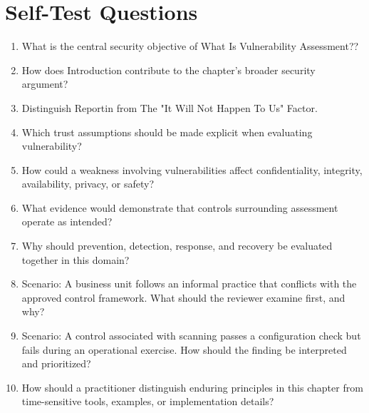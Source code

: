 \documentclass[11pt,letterpaper]{article}
\begin{document}
\section*{Self-Test Questions}
\begin{enumerate}
\item What is the central security objective of What Is Vulnerability Assessment??
\item How does Introduction contribute to the chapter's broader security argument?
\item Distinguish Reportin from The "It Will Not Happen To Us" Factor.
\item Which trust assumptions should be made explicit when evaluating vulnerability?
\item How could a weakness involving vulnerabilities affect confidentiality, integrity, availability, privacy, or safety?
\item What evidence would demonstrate that controls surrounding assessment operate as intended?
\item Why should prevention, detection, response, and recovery be evaluated together in this domain?
\item Scenario: A business unit follows an informal practice that conflicts with the approved control framework. What should the reviewer examine first, and why?
\item Scenario: A control associated with scanning passes a configuration check but fails during an operational exercise. How should the finding be interpreted and prioritized?
\item How should a practitioner distinguish enduring principles in this chapter from time-sensitive tools, examples, or implementation details?
\end{enumerate}
\end{document}

